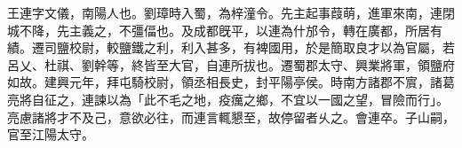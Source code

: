 
\begin{pinyinscope}
王連字文儀，南陽人也。劉璋時入蜀，為梓潼令。先主起事葭萌，進軍來南，連閉城不降，先主義之，不彊偪也。及成都旣平，以連為什邡令，轉在廣都，所居有績。遷司鹽校尉，較鹽鐵之利，利入甚多，有裨國用，於是簡取良才以為官屬，若呂乂、杜祺、劉幹等，終皆至大官，自連所拔也。遷蜀郡太守、興業將軍，領鹽府如故。建興元年，拜屯騎校尉，領丞相長史，封平陽亭侯。時南方諸郡不賔，諸葛亮將自征之，連諫以為「此不毛之地，疫癘之鄉，不宜以一國之望，冒險而行」。亮慮諸將才不及己，意欲必往，而連言輒懇至，故停留者乆之。會連卒。子山嗣，官至江陽太守。


\end{pinyinscope}
